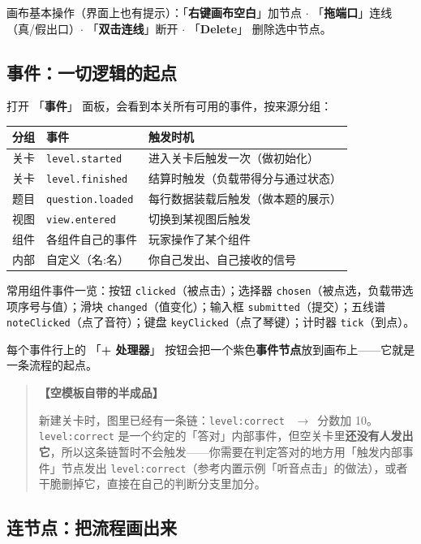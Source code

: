 \documentclass[UTF8,a4paper,zihao=-4]{ctexart}
\newcommand{\code}[1]{\texttt{#1}}   %
\newcommand{\ui}[1]{「\textbf{#1}」}  %
\newcommand{\ra}{\ $\rightarrow$\ }  %
\newenvironment{tip}[1][提示]{%
  \begin{quote}\small\textbf{【#1】}\ignorespaces
}{\end{quote}}
\begin{document}
画布基本操作（界面上也有提示）：\ui{右键画布空白}加节点 $\cdot$ \ui{拖端口}连线（真/假出口）$\cdot$ \ui{双击连线}断开 $\cdot$ \ui{Delete} 删除选中节点。

\subsection{事件：一切逻辑的起点}

打开 \ui{事件} 面板，会看到本关所有可用的事件，按来源分组：

\begin{center}
\begin{tabular}{lll}
\toprule
分组 & 事件 & 触发时机 \\
\midrule
关卡 & \code{level.started} & 进入关卡后触发一次（做初始化） \\
关卡 & \code{level.finished} & 结算时触发（负载带得分与通过状态） \\
题目 & \code{question.loaded} & 每行数据装载后触发（做本题的展示） \\
视图 & \code{view.entered} & 切换到某视图后触发 \\
组件 & 各组件自己的事件 & 玩家操作了某个组件 \\
内部 & 自定义（名:名） & 你自己发出、自己接收的信号 \\
\bottomrule
\end{tabular}
\end{center}

常用组件事件一览：按钮 \code{clicked}（被点击）；选择器 \code{chosen}（被点选，负载带选项序号与值）；滑块 \code{changed}（值变化）；输入框 \code{submitted}（提交）；五线谱 \code{noteClicked}（点了音符）；键盘 \code{keyClicked}（点了琴键）；计时器 \code{tick}（到点）。

每个事件行上的 \ui{+ 处理器} 按钮会把一个紫色\textbf{事件节点}放到画布上——它就是一条流程的起点。

\begin{tip}[空模板自带的半成品]
新建关卡时，图里已经有一条链：\code{level:correct} \ra 分数加 10。\code{level:correct} 是一个约定的「答对」内部事件，但空关卡里\textbf{还没有人发出它}，所以这条链暂时不会触发——你需要在判定答对的地方用「触发内部事件」节点发出 \code{level:correct}（参考内置示例「听音点击」的做法），或者干脆删掉它，直接在自己的判断分支里加分。
\end{tip}

\subsection{连节点：把流程画出来}
\end{document}
